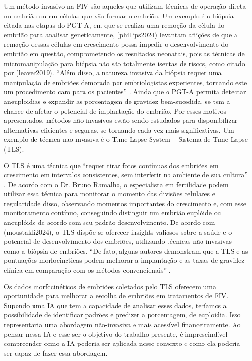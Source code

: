 Um método invasivo na FIV são aqueles que utilizam técnicas de operação direta no embrião ou em células que vão formar o embrião. Um exemplo é a biópsia citada nas etapas do PGT-A, em que se realiza uma remoção da célula do embrião para analisar geneticamente, \citeonline(phillips2024) levantam aflições de que a remoção dessas células em crescimento possa impedir o desenvolvimento do embrião em questão, comprometendo os resultados neonatais, pois as técnicas de micromanipulação para biópsia não são totalmente isentas de riscos, como citado por \citeonline(leaver2019). “Além disso, a natureza invasiva da biópsia requer uma manipulação de embriões demorada por embriologistas experientes, tornando este um procedimento caro para os pacientes” \cite{phillips2024; leaver2019}. Ainda que o PGT-A permita detectar aneuploidias e expandir as porcentagem de gravidez bem-sucedida, se tem a chance de afetar o potencial de implantação do embrião. Por esses motivos apresentados, métodos não-invasivos estão sendo estudados para disponibilizar alternativas eficientes e seguras, se tornando cada vez mais significativas. Um exemplo de técnica não-invasiva é o Time-Lapse System – Sistema de Time-Lapse (TLS).

O TLS é uma técnica que “requer tirar fotos contínuas dos embriões em crescimento em intervalos consistentes, sem interferir no ambiente de sua cultura” \cite{moustakli2024}. De acordo com o Dr. Bruno Ramalho, o especialista em fertilidade podem utilizar essa técnica para monitorar o momento das divisões celulares e regularidade disso, observando momentos importantes do crescimento e, com esse monitoramento contínuo, conseguindo distinguir um embrião euplóide ou aneuplóide de acordo com seu padrão desenvolvimento. De acordo com \citeonline(moustakli2024), o TLS dispõe-se oferecer insights valiosos sobre a saúde e o potencial de desenvolvimento dos embriões, utilizando técnicas não invasivas como a biópsia de embriões. “De fato, alguns autores demonstram que a TLS e as pontuações morfocinéticas podem melhorar a implantação e as taxas de gravidez clínica em comparação com os métodos convencionais” \cite{boucret2021}.

Os dados morfocinéticos de embriões coletados pelo TLS oferecem uma oportunidade para melhorar a escolha de embriões em tratamentos de FIV. Supondo uma IA que tem a capacidade de analisar esses dados, teríamos a possibilidade de identificar padrões e predizer a porcentagem, de euploidia. Isso representaria uma abordagem não-invasiva e mais acessível financeiramente. Ao pensar nessa IA e esse ser o objetivo do trabalho presente, é imprescindível compreender como a IA poderia ser aplicada nesse contexto e como ela poderia ser capaz de fazer essa abordagem. 

